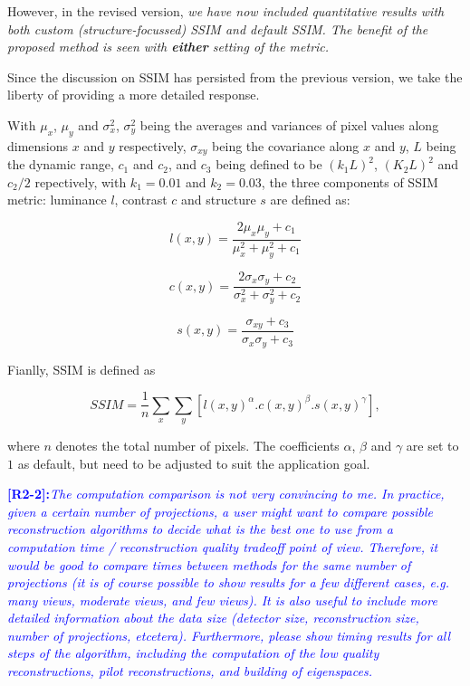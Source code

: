 \documentclass[11pt]{article}
\begin{document}
\begin{enumerate}
    However, in the revised version, \emph{we have now included quantitative
    results with both custom (structure-focussed) SSIM and default
    SSIM. The benefit of the proposed method is seen with
    \textbf{either} setting of the metric.}

    Since the discussion on SSIM has persisted from the previous
    version, we take the liberty of providing a more detailed
    response. %

    With $\mu_x$, $\mu_y$ and $\sigma_x^2$, $\sigma_y^2$ being the
    averages and variances of pixel values along dimensions $x$ and
    $y$ respectively, $\sigma_{xy}$ being the covariance along $x$ and
    $y$, $L$ being the dynamic range, $c_1$ and $c_2$, and $c_3$ being
    defined to be $(k_1L)^2$, $(K_2L)^2$ and $c_2/2$ repectively, with
    $k_1=0.01$ and $k_2=0.03$, the three components of SSIM metric:
    luminance $l$, contrast $c$ and structure $s$ are defined as:

\begin{equation}
l(x,y) = \frac{2\mu_x\mu_y + c_1}{\mu_x^2 + \mu_y^2 + c_1}
\end{equation}

\begin{equation}
  c(x,y) = \frac{2\sigma_x\sigma_y + c_2}{\sigma_x^2 + \sigma_y^2 + c_2}
\end{equation}

\begin{equation}
  s(x,y) = \frac{\sigma_{xy} + c_3}{\sigma_x\sigma_y + c_3}
\end{equation}

Fianlly, SSIM is defined as

\begin{equation}
  SSIM = \frac{1}{n}\sum_x\sum_y [l(x,y)^\alpha. c(x,y)^\beta. s(x,y)^\gamma],
\end{equation}

where $n$ denotes the total number of pixels. The coefficients
$\alpha$, $\beta$ and $\gamma$ are set to $1$ as default, but need to
be adjusted to suit the application goal.
\end{enumerate}

\vspace{0.5cm}\textcolor{blue}{\textbf{[R2-2]:}\textit{The computation comparison is
    not very convincing to me. In practice, given a certain number of
    projections, a user might want to compare possible reconstruction
    algorithms to decide what is the best one to use from a
    computation time / reconstruction quality tradeoff point of
    view. Therefore, it would be good to compare times between methods
    for the same number of projections (it is of course possible to
    show results for a few different cases, e.g. many views, moderate
    views, and few views). It is also useful to include more detailed
    information about the data size (detector size, reconstruction
    size, number of projections, etcetera). Furthermore, please show
    timing results for all steps of the algorithm, including the
    computation of the low quality reconstructions, pilot
    reconstructions, and building of eigenspaces.}} 
\end{document}

